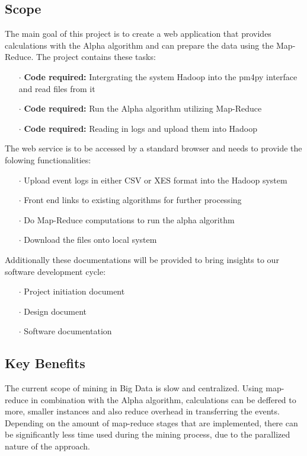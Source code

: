\documentclass[runningheads]{llncs}
\begin{document}
\subsection{Scope}
The main goal of this project is to create a web application that provides calculations with the Alpha algorithm and can prepare the data using the Map-Reduce. The project contains these tasks:\\
\begin{itemize}
	\item[\Large $\cdot$] \textbf{Code required:} Intergrating the system Hadoop into the pm4py interface and read files from it
	\item[\Large $\cdot$] \textbf{Code required:} Run the Alpha algorithm utilizing Map-Reduce 
	\item[\Large $\cdot$] \textbf{Code required:} Reading in logs and upload them into Hadoop
\end{itemize}
The web service is to be accessed by a standard browser and needs to provide the folowing functionalities:
\begin{itemize}
	\item[\Large $\cdot$] Upload event logs in either CSV or XES format into the Hadoop system
	\item[\Large $\cdot$] Front end links to existing algorithms for further processing
	\item[\Large $\cdot$] Do Map-Reduce computations to run the alpha algorithm
	\item[\Large $\cdot$] Download the files onto local system
\end{itemize}
Additionally these documentations will be provided to bring insights to our software development cycle:
\begin{itemize}
	\item[\Large $\cdot$]  Project initiation document
	\item[\Large $\cdot$]  Design document
	\item[\Large $\cdot$]  Software documentation
\end{itemize}
\subsection{Key Benefits}
The current scope of mining in Big Data is slow and centralized. Using map-reduce in combination with the Alpha algorithm, calculations can be deffered to more, smaller instances and also reduce overhead in transferring the events. Depending on the amount of  map-reduce stages that are implemented, there can be significantly less time used during the mining process, due to the parallized nature of the approach. \cite{mapReduce}
\end{document}
